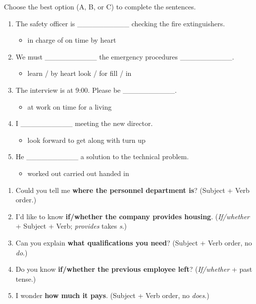 \documentclass[11pt]{article}
\begin{document}
\begin{exercice}
Choose the best option (A, B, or C) to complete the sentences.
\begin{enumerate}
    \item The safety officer is \_\_\_\_\_\_\_\_\_\_ checking the fire extinguishers.
        \begin{itemize}
            \item[A)] in charge of \quad [B)] on time \quad [C)] by heart
        \end{itemize}
    \item We must \_\_\_\_\_\_\_\_\_\_ the emergency procedures \_\_\_\_\_\_\_\_\_\_.
        \begin{itemize}
            \item[A)] learn / by heart \quad [B)] look / for \quad [C)] fill / in
        \end{itemize}
    \item The interview is at 9:00. Please be \_\_\_\_\_\_\_\_\_\_.
        \begin{itemize}
            \item[A)] at work \quad [B)] on time \quad [C)] for a living
        \end{itemize}
    \item I \_\_\_\_\_\_\_\_\_\_ meeting the new director.
        \begin{itemize}
            \item[A)] look forward to \quad [B)] get along with \quad [C)] turn up
        \end{itemize}
    \item He \_\_\_\_\_\_\_\_\_\_ a solution to the technical problem.
        \begin{itemize}
            \item[A)] worked out \quad [B)] carried out \quad [C)] handed in
        \end{itemize}
\end{enumerate}
\end{exercice}

\begin{corrige}
\begin{enumerate}
    \item Could you tell me \textbf{where the personnel department is}? (Subject + Verb order.)
    \item I'd like to know \textbf{if/whether the company provides housing}. (\emph{If/whether} + Subject + Verb; \emph{provides} takes \emph{s}.)
    \item Can you explain \textbf{what qualifications you need}? (Subject + Verb order, no \emph{do}.)
    \item Do you know \textbf{if/whether the previous employee left}? (\emph{If/whether} + past tense.)
    \item I wonder \textbf{how much it pays}. (Subject + Verb order, no \emph{does}.)
\end{enumerate}
\end{corrige}
\end{document}
